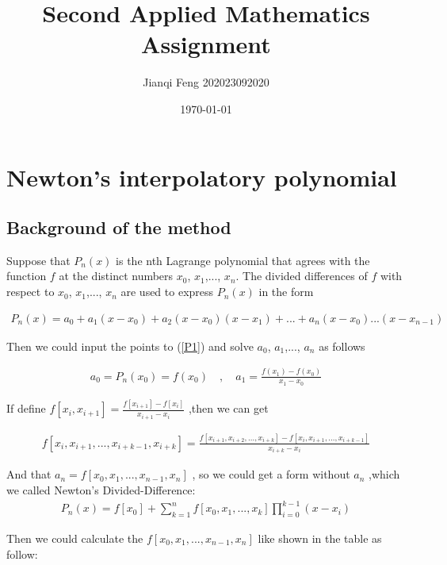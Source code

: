 \documentclass{article}
\title{\vspace{+4cm}\textbf{Second Applied Mathematics Assignment}}
\author{Jianqi Feng 202023092020}
\date{\today}
\begin{document}
\maketitle
\newpage
{}
\setcounter{page}{0}
\tableofcontents

\newpage
\setcounter{page}{1}
\setlength{\parindent}{2em}

\section{Newton’s interpolatory polynomial}
\subsection{Background of the method}
Suppose that $P_{n}(x)$ is the nth Lagrange polynomial that agrees with the function $f$ at
the distinct numbers $x_0$, $x_1$,..., $x_n$. The divided differences of $f$
with respect to $x_0$, $x_1$,..., $x_n$ are used to express $P_{n}(x)$ in the form

\begin{align}
P_{n}(x) = a_0 + a_1(x - x_0) + a_2(x - x_0)(x - x_1) +...+ a_n(x - x_0)...(x - x_{n-1})
\label{P1}
\end{align}

Then we could input the points to (\ref{P1}) and solve $a_0$, $a_1$,..., $a_n$ as follows

\begin{align}
a_0 = P_{n}(x_0) = f (x_0) \quad ,\quad a_1 = \frac{f (x_1) - f (x_0)}{x_1 - x_0}\nonumber 
\end{align}

If define $ f [x_i, x_{i+1}] = \frac{f [x_{i+1}] - f [x_i]}{x_{i+1} - x_i}$ ,then we can get

\begin{align}
f [x_i, x_{i+1},..., x_{i+k−1}, x_{i+k} ] = \frac{f [x_{i+1}, x_{i+2},..., x_{i+k} ] - f [x_{i}, x_{i+1},..., x_{i+k−1}]}{x_{i+k} - x_i}\nonumber 
\end{align}


And that $a_n = f [x_0, x_1,..., x_{n-1}, x_{n}]$ , so we could get a form without $a_n$ ,which we called Newton's Divided-Difference:
\begin{align}
P_{n}(x) = f [x_0] +\sum_{k=1}^n
f[x_0, x_1,..., x_k]\prod_{i=0}^{k-1}(x - x_i)
\label{P2}
\end{align}


Then we could calculate the $f [x_0, x_1,..., x_{n-1}, x_{n}]$ like shown in the table as follow:
\end{document}
